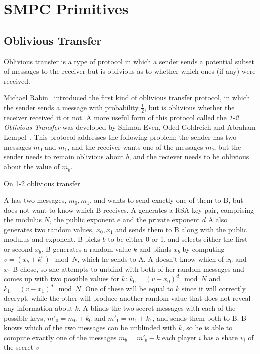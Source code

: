 

\section{SMPC Primitives}
\label{sec:smpc-prim}

\subsection{Oblivious Transfer}
\label{sec:ot-prim}

Oblivious transfer is a type of protocol in which a sender sends a potential subset of messages to the 
receiver but is oblivious as to whether which ones (if any) were received.

Michael Rabin~\cite{Rabin81:HtESwOT} introduced the first kind of oblivious 
transfer protocol, in which the sender sends a message with probability 
$\frac{1}{2}$, but is oblivious whether the receiver received it or not. A more
useful form of this protocol called the \emph{1-2 Oblivious Transfer} was
developed by Shimon Even, Oded Goldreich and Abraham Lempel~\cite{Even:1985:RPS:3812.3818}.
This protocol addresses the following problem: the sender has two messages 
$m_0$ and $m_1$, and the receiver wants one of the messages $m_b$, but the 
sender needs to remain oblivious about $b$, and the reciever needs to be 
oblivious about the value of $m_{\bar{b}}$.

\begin{algorithm}
\caption{On 1-2 oblivious transfer}
\label{algshare}
\begin{algorithmic}
\REQUIRE A has two messages, $m_0, m_1$, and wants to send exactly one of them to B, but does not want to know which B receives.
\STATE A generates a RSA key pair, comprising the modulus $N$, the public exponent $e$ and the private exponent $d$
\STATE A also generates two random values, $x_0, x_1$ and sends them to B 
along with the public modulus and exponent.
\STATE B picks $b$ to be either 0 or 1, and selects either the first or second $x_b$.
\STATE B generates a random value $k$ and blinds $x_b$ by computing $v = (x_b + k^e)\mod N$, which he sends to A.
\STATE A doesn't know which of $x_0$ and $x_1$ B chose, so she attempts to unblind with both of her random messages and comes up with two possible values for $k$: $k_0 = (v - x_0)^d\mod N$ and $k_1 = (v - x_1)^d\mod N$.  One of these will be equal to $k$ since it will correctly decrypt, while the other will produce another random value that does not reveal any information about $k$.
\STATE A blinds the two secret messages with each of the possible keys, $m'_0 = m_0 + k_0$ and $m'_1 = m_1 + k_1$, and sends them both to B.
\STATE B knows which of the two messages can be unblinded with $k$, so he is able to compute exactly one of the messages $m_b = m'_b - k$
\ENSURE each player $i$ has a share $v_{i}$ of the secret $v$
\end{algorithmic}
\end{algorithm}

